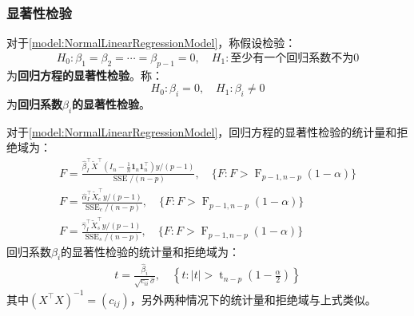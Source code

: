 \subsubsection{显著性检验}
\begin{definition}
	对于\cref{model:NormalLinearRegressionModel}，称假设检验：
	\begin{equation*}
		H_0:\beta_1=\beta_2=\cdots=\beta_{p-1}=0,\quad H_1:\text{至少有一个回归系数不为}0
	\end{equation*}
	为\textbf{回归方程的显著性检验}。称：
	\begin{equation*}
		H_0:\beta_i=0,\quad H_1:\beta_i\ne0
	\end{equation*}
	为\textbf{回归系数$\beta_i$的显著性检验}。
\end{definition}
\begin{theorem}\label{theo:LinearRegressionModelTSH}
	对于\cref{model:NormalLinearRegressionModel}，回归方程的显著性检验的统计量和拒绝域为：
	\begin{gather*}
		F=\frac{\hat{\beta}_I^{\top}\tilde{X}^{\top}\left(I_n-\frac{1}{n}\mathbf{1}_n\mathbf{1}_n^{\top}\right)y/(p-1)}{\operatorname{SSE}/(n-p)},\quad \{F:F>\operatorname{F}_{p-1,n-p}(1-\alpha)\} \\
		F=\frac{\hat{\alpha}_I^{\top}\tilde{X}_c^{\top}y/(p-1)}{\operatorname{SSE}_c/(n-p)},\quad \{F:F>\operatorname{F}_{p-1,n-p}(1-\alpha)\} \\
		F=\frac{\hat{\gamma}_I^{\top}\tilde{X}_s^{\top}y/(p-1)}{\operatorname{SSE}_s/(n-p)},\quad \{F:F>\operatorname{F}_{p-1,n-p}(1-\alpha)\}
	\end{gather*}
	回归系数$\beta_i$的显著性检验的统计量和拒绝域为：
	\begin{gather*}
		t=\frac{\hat{\beta}_i}{\sqrt{c_{ii}}\hat{\sigma}},\quad\left\{t:|t|>\operatorname{t}_{n-p}\left(1-\frac{\alpha}{2}\right)\right\}
	\end{gather*}
	其中$(X^{\top}X)^{-1}=(c_{ij})$，另外两种情况下的统计量和拒绝域与上式类似。
\end{theorem}
